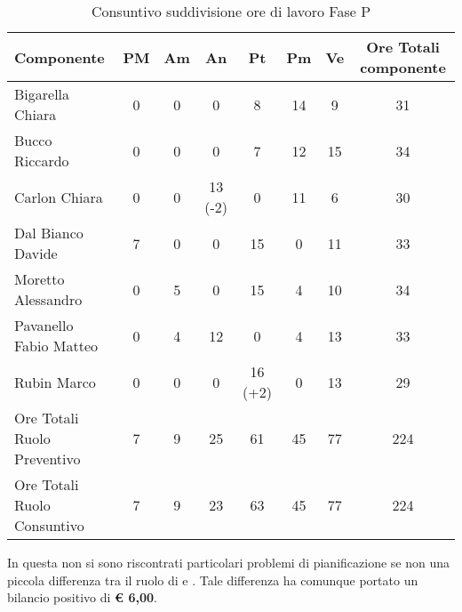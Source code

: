 			\begin{table}[H]
				\begin{center}
					\begin{tabular}{| l | c | c | c | c | c | c | c |}
						\hline
						Componente 					& PM	& Am 	& An 	& Pt 		& Pm 		& Ve 	& Ore Totali componente \\ \hline
						
						Bigarella Chiara 			& 0		& 0		& 0		& 8 		& 14 		& 9 		& 31 \\
						Bucco Riccardo 				& 0		& 0		& 0		& 7 		& 12		& 15 		& 34 \\
						Carlon Chiara				& 0		& 0		& 13 (-2) & 0		& 11 		& 6 		& 30 \\
						Dal Bianco Davide 			& 7 	& 0		& 0		& 15 		& 0			& 11 		& 33 \\
						Moretto Alessandro 			& 0		& 5 	& 0		& 15 		& 4 		& 10 		& 34 \\
						Pavanello Fabio Matteo		& 0		& 4		& 12 	& 0			& 4 		& 13 		& 33 \\
						Rubin Marco					& 0		& 0 	& 0		& 16 (+2)	& 0			& 13 		& 29 \\ \hline \hline
						
						Ore Totali Ruolo Preventivo & 7 	& 9 	& 25 	& 61 		& 45 		& 77 		& 224	\\ 
						Ore Totali Ruolo Consuntivo & 7 	& 9 	& 23    & 63		& 45 		& 77 		& 224	\\ \hline
					\end{tabular}
				\end{center}
				\caption{Consuntivo suddivisione ore di lavoro Fase P}
			\end{table}

			In questa  non si sono riscontrati particolari problemi di pianificazione se non una piccola differenza tra il ruolo di  e . Tale differenza ha comunque portato un bilancio positivo di \textbf{\euro{} 6,00}.
	

